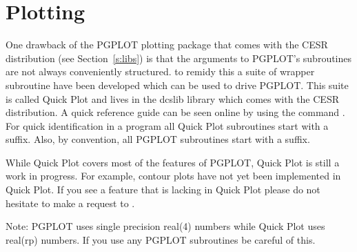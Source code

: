 \chapter{Plotting}
\label{c:plot}

One drawback of the PGPLOT plotting package that comes with the CESR
distribution (see Section~\ref{s:libs}) is that the arguments to
PGPLOT's subroutines are not always conveniently structured. to remidy
this a suite of wrapper subroutine have been developed which can be
used to drive PGPLOT. This suite is called Quick Plot and lives in the
dcslib library which comes with the CESR distribution. A quick
reference guide can be seen online by using the command . For quick identification in a program all Quick Plot
subroutines start with a  suffix. Also, by convention, all
PGPLOT subroutines start with a  suffix.

While Quick Plot covers most of the features of PGPLOT, Quick Plot is
still a work in progress.  For example, contour plots have not yet
been implemented in Quick Plot. If you see a feature that is lacking
in Quick Plot please do not hesitate to make a request to
.

Note: PGPLOT uses single precision real(4) numbers while Quick Plot
uses real(rp) numbers.  If you use any PGPLOT subroutines be careful
of this.


